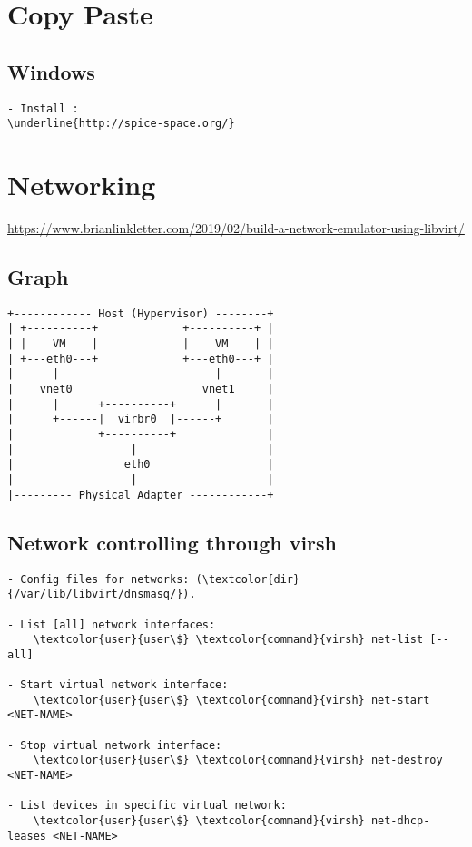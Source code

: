 \documentclass[10pt, a4paper, onecolumn, openany]{book} %
\begin{document}
\section{Copy Paste}
\subsection{Windows}
\begin{Verbatim}[commandchars=\\\{\}]
- Install :
\underline{http://spice-space.org/}
\end{Verbatim}




\section{Networking}
\underline{\url{https://www.brianlinkletter.com/2019/02/build-a-network-emulator-using-libvirt/}}

\subsection{Graph}
\begin{Verbatim}[commandchars=\\\{\}]
+------------ Host (Hypervisor) --------+
| +----------+             +----------+ |
| |    VM    |             |    VM    | |
| +---eth0---+             +---eth0---+ |
|      |                        |       |
|    vnet0                    vnet1     |
|      |      +----------+      |       |
|      +------|  virbr0  |------+       |
|             +----------+              |
|                  |                    |
|                 eth0                  |
|                  |                    |
|--------- Physical Adapter ------------+
\end{Verbatim}
\subsection{Network controlling through virsh}
\begin{Verbatim}[commandchars=\\\{\}]
- Config files for networks: (\textcolor{dir}{/var/lib/libvirt/dnsmasq/}).

- List [all] network interfaces:
    \textcolor{user}{user\$} \textcolor{command}{virsh} net-list [--all]

- Start virtual network interface:
    \textcolor{user}{user\$} \textcolor{command}{virsh} net-start <NET-NAME>

- Stop virtual network interface:
    \textcolor{user}{user\$} \textcolor{command}{virsh} net-destroy <NET-NAME>
    
- List devices in specific virtual network:
    \textcolor{user}{user\$} \textcolor{command}{virsh} net-dhcp-leases <NET-NAME>
\end{Verbatim}
\end{document}
